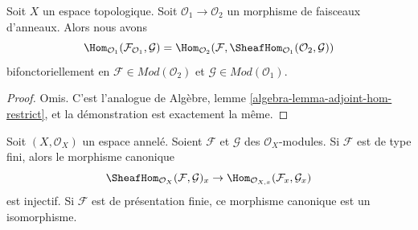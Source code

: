\begin{lemma}
\label{lemma-adjoint-tensor-restrict}
Soit $X$ un espace topologique. Soit $\mathcal{O}_1 \to \mathcal{O}_2$
un morphisme de faisceaux d'anneaux. Alors nous avons
$$
\Hom_{\mathcal{O}_1}(\mathcal{F}_{\mathcal{O}_1}, \mathcal{G}) =
\Hom_{\mathcal{O}_2}(\mathcal{F},
\SheafHom_{\mathcal{O}_1}(\mathcal{O}_2, \mathcal{G}))
$$
bifonctoriellement en $\mathcal{F} \in \textit{Mod}(\mathcal{O}_2)$
et $\mathcal{G} \in \textit{Mod}(\mathcal{O}_1)$.
\end{lemma}

\begin{proof}
Omis. C'est l'analogue de
Algèbre, lemme \ref{algebra-lemma-adjoint-hom-restrict},
et la démonstration est exactement la même.
\end{proof}

\begin{lemma}
\label{lemma-stalk-internal-hom}
Soit $(X, \mathcal{O}_X)$ un espace annelé.
Soient $\mathcal{F}$ et $\mathcal{G}$ des $\mathcal{O}_X$-modules.
Si $\mathcal{F}$ est de type fini, alors le morphisme canonique
$$
\SheafHom_{\mathcal{O}_X}(\mathcal{F}, \mathcal{G})_x
\to
\Hom_{\mathcal{O}_{X, x}}(\mathcal{F}_x, \mathcal{G}_x)
$$
est injectif.
Si $\mathcal{F}$ est de présentation finie,
ce morphisme canonique est un isomorphisme.
\end{lemma}

